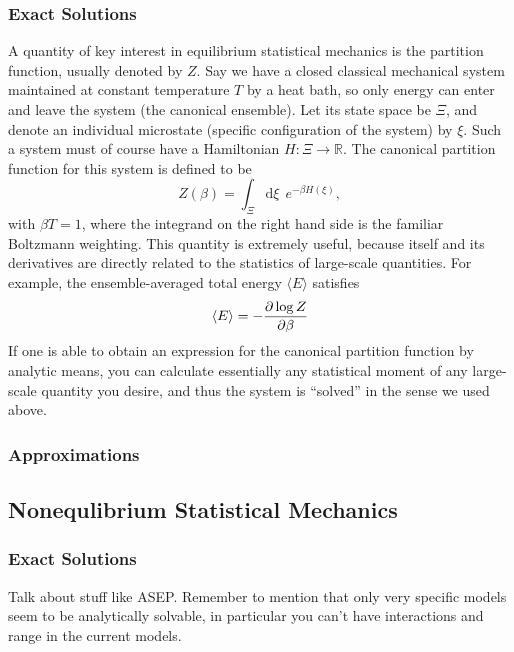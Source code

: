 \subsubsection{Exact Solutions}

A quantity of key interest in equilibrium statistical mechanics is the partition function, usually denoted by $Z$. Say we have a closed classical mechanical system maintained at constant temperature $T$ by a heat bath,
so only energy can enter and leave the system (the canonical ensemble). Let its state space be $\Xi$, and denote an individual microstate (specific configuration of the system) by $\xi$.
Such a system must of course have a Hamiltonian $H : \Xi \rightarrow \mathbb{R}$. The canonical partition function for this system is defined to be
\begin{equation}
 Z(\beta) = \int_\Xi  \! \! \mathrm{d}  \xi \  \  e^{- \beta H(\xi)},
\end{equation}
with $\beta T = 1$, where the integrand on the right hand side is the familiar Boltzmann weighting. This quantity is extremely useful, because itself and its derivatives are directly related to the statistics of large-scale quantities.
For example, the ensemble-averaged total energy $\langle E \rangle$ satisfies
\begin{equation}
 \langle E \rangle = - \frac{\partial \log{Z}}{\partial \beta}
\end{equation}
If one is able to obtain an expression for the canonical partition function by analytic means, you can calculate essentially any statistical moment of any large-scale quantity you desire, and thus the system is ``solved'' in the sense we used above.



\subsubsection{Approximations}


\subsection{Nonequlibrium Statistical Mechanics}

\subsubsection{Exact Solutions}

Talk about stuff like ASEP. Remember to mention that only very specific models seem to be analytically solvable, in particular you can't have interactions and range in the current models.

